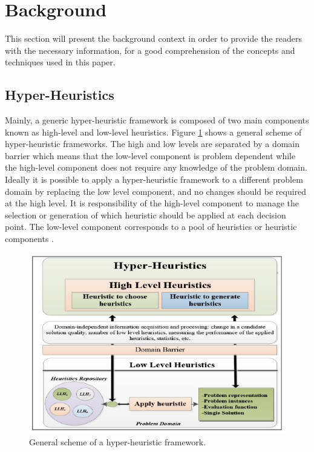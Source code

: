 \documentclass[conference]{IEEEtran}
\begin{document}
\section{Background}
\label{sec:background}

This section will present the background context in order to provide the readers with the necessary information, for a good comprehension of the concepts and techniques used in this paper.  


\subsection{Hyper-Heuristics}
\label{subsec:hyperheuristics}

	Mainly, a generic hyper-heuristic framework is composed of two main components known as high-level and low-level heuristics. Figure \ref{fig:HyperHeuristics} shows a general scheme of hyper-heuristic frameworks. The high and low levels are separated by a domain barrier which means that the low-level component is problem dependent while the high-level component does not require any knowledge of the problem domain. Ideally it is possible to apply a hyper-heuristic framework to a different problem domain by replacing the low level component, and no changes should be required at the high level. It is responsibility of the high-level component to manage the selection or generation of which heuristic should be applied at each decision point. The low-level component corresponds to a pool of heuristics or heuristic components \cite{sabar2015automatic}. 
 
 
\begin{figure}[htb!] \label{fig:HyperHeuristics}
	\centering
	\includegraphics[scale=0.6]{figures/hyperheuristic.png}
	\caption{General scheme of a hyper-heuristic framework.}
\end{figure}	
\end{document}
